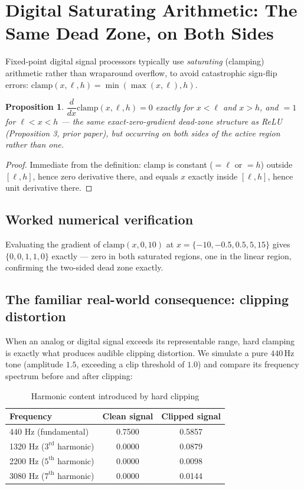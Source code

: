 \documentclass[10pt,journal,compsoc]{IEEEtran}
\newtheorem{proposition}{Proposition}
\begin{document}
\section{Digital Saturating Arithmetic: The Same Dead Zone, on Both Sides}
Fixed-point digital signal processors typically use \emph{saturating} (clamping) arithmetic rather than wraparound overflow, to avoid catastrophic sign-flip errors: $\mathrm{clamp}(x,\ell,h) = \min(\max(x,\ell),h)$.

\begin{proposition}
$\dfrac{d}{dx}\mathrm{clamp}(x,\ell,h) = 0$ exactly for $x<\ell$ and $x>h$, and $=1$ for $\ell<x<h$ — the same exact-zero-gradient dead-zone structure as ReLU (Proposition 3, prior paper), but occurring on \emph{both} sides of the active region rather than one.
\end{proposition}
\begin{proof}
Immediate from the definition: $\mathrm{clamp}$ is constant ($=\ell$ or $=h$) outside $[\ell,h]$, hence zero derivative there, and equals $x$ exactly inside $[\ell,h]$, hence unit derivative there.
\end{proof}

\subsection{Worked numerical verification}
Evaluating the gradient of $\mathrm{clamp}(x,0,10)$ at $x=\{-10,-0.5,0.5,5,15\}$ gives $\{0,0,1,1,0\}$ exactly — zero in both saturated regions, one in the linear region, confirming the two-sided dead zone exactly.

\subsection{The familiar real-world consequence: clipping distortion}
When an analog or digital signal exceeds its representable range, hard clamping is exactly what produces audible clipping distortion. We simulate a pure $440\,$Hz tone (amplitude $1.5$, exceeding a clip threshold of $1.0$) and compare its frequency spectrum before and after clipping:

\begin{table}[h]
\centering
\caption{Harmonic content introduced by hard clipping}
\begin{tabular}{lcc}
\toprule
\textbf{Frequency} & \textbf{Clean signal} & \textbf{Clipped signal} \\
\midrule
440 Hz (fundamental)  & 0.7500 & 0.5857 \\
1320 Hz ($3^{\text{rd}}$ harmonic) & 0.0000 & 0.0879 \\
2200 Hz ($5^{\text{th}}$ harmonic) & 0.0000 & 0.0098 \\
3080 Hz ($7^{\text{th}}$ harmonic) & 0.0000 & 0.0144 \\
\bottomrule
\end{tabular}
\end{table}
\end{document}
